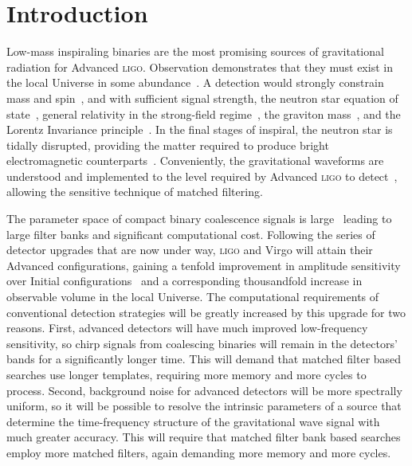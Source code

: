 \section{Introduction}
\label{sec:introduction}



Low-mass inspiraling binaries are the most promising sources of gravitational
radiation for Advanced \textsc{ligo}. Observation demonstrates that they must
exist in the local Universe in some abundance~\cite{Abadie:2010p10836}.
A detection would strongly constrain mass and
spin~\cite{finn1993,Poisson:1995ef}, and with sufficient signal strength, the
neutron star equation of state~\cite{flanagan:021502,Read:2009}, general
relativity in the strong-field regime~\cite{Will:2005va}, the graviton
mass~\cite{PhysRevD.80.044002,Keppel:2010qu}, and the Lorentz Invariance
principle~\cite{Ellis2006402}. In the
final stages of inspiral, the neutron star is tidally disrupted, providing the
matter required to produce bright electromagnetic
counterparts~\cite{shibata:2007}. Conveniently, the gravitational waveforms are
understood and implemented to the level required by Advanced \textsc{ligo} to
detect~\cite{BuonannoIyerOchsnerYiSathya2009}, allowing the sensitive technique
of matched filtering.

The parameter space of compact binary coalescence signals is
large~\cite{Owen:1995tm, Owen:1998dk} leading to large filter banks and
significant computational cost. Following the series of detector upgrades that
are now under way, \textsc{ligo} and Virgo will attain their Advanced
configurations, gaining a tenfold improvement in amplitude sensitivity over
Initial configurations~\cite{advLIGOrefdesign,advVirgorefdesign} and a
corresponding thousandfold increase in observable volume in the local Universe.
The computational requirements of conventional detection strategies will be
greatly increased by this upgrade for two reasons. First, advanced detectors
will have much improved low-frequency sensitivity, so chirp signals from
coalescing binaries will remain in the detectors' bands for a significantly
longer time. This will demand that matched filter based searches use longer
templates, requiring more memory and more cycles to process. Second, background
noise for advanced detectors will be more spectrally uniform, so it will be
possible to resolve the intrinsic parameters of a source that determine the
time-frequency structure of the gravitational wave signal with much greater
accuracy. This will require that matched filter bank based searches employ
more matched filters, again demanding more memory and more cycles.

